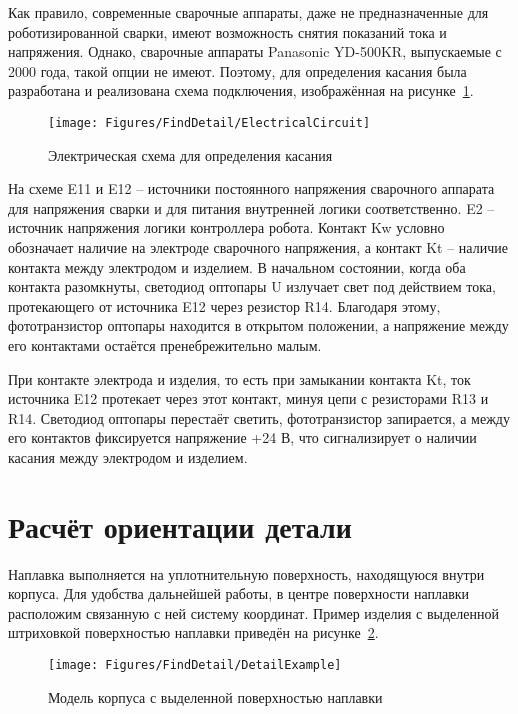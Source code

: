 Как правило, современные сварочные аппараты, даже не предназначенные для роботизированной сварки, имеют возможность снятия показаний тока и напряжения.
Однако, сварочные аппараты Panasonic YD-500KR, выпускаемые с 2000 года, такой опции не имеют.
Поэтому, для определения касания была разработана и реализована схема подключения, изображённая на рисунке~\ref{fig:FindDetail:ElectricalCircuit}.

\begin{figure}[H]
    \centering
    \vspace{14pt}
    \texttt{[image: Figures/FindDetail/ElectricalCircuit]}
    \caption{Электрическая схема для определения касания}
    \label{fig:FindDetail:ElectricalCircuit}
\end{figure}

На схеме E11 и E12 -- источники постоянного напряжения сварочного аппарата для напряжения сварки и для питания внутренней логики соответственно.
E2 -- источник напряжения логики контроллера робота.
Контакт Kw условно обозначает наличие на электроде сварочного напряжения, а контакт Kt -- наличие контакта между электродом и изделием.
В начальном состоянии, когда оба контакта разомкнуты, светодиод оптопары U излучает свет под действием тока, протекающего от источника E12 через резистор R14.
Благодаря этому, фототранзистор оптопары находится в открытом положении, а напряжение между его контактами остаётся пренебрежительно малым.

При контакте электрода и изделия, то есть при замыкании контакта Kt, ток источника E12 протекает через этот контакт, минуя цепи с резисторами R13 и R14.
Светодиод оптопары перестаёт светить, фототранзистор запирается, а между его контактов фиксируется напряжение +24 В, что сигнализирует о наличии касания между электродом и изделием.


\section{Расчёт ориентации детали} \label{sec:DetailOrientation}
Наплавка выполняется на уплотнительную поверхность, находящуюся внутри корпуса.
Для удобства дальнейшей работы, в центре поверхности наплавки расположим связанную с ней систему координат.
Пример изделия с выделенной штриховкой поверхностью наплавки приведён на рисунке~\ref{fig:FindDetail:ValveExample}.

\begin{figure}[H]
    \centering
    \vspace{14pt}
    \texttt{[image: Figures/FindDetail/DetailExample]}
    \caption{Модель корпуса с выделенной поверхностью наплавки}
    \label{fig:FindDetail:ValveExample}
\end{figure}

